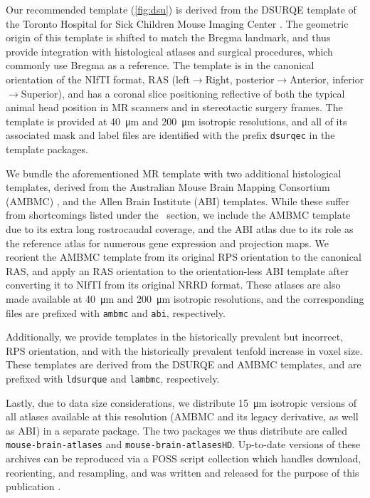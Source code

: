 Our recommended template (\cref{fig:dsu}) is derived from the DSURQE template of the Toronto Hospital for Sick Children Mouse Imaging Center \cite{dsu}.
The geometric origin of this template is shifted to match the Bregma landmark, and thus provide integration with histological atlases and surgical procedures, which commonly use Bregma as a reference.
The template is in the canonical orientation of the NIfTI format, RAS (left$\rightarrow$Right, posterior$\rightarrow$Anterior, inferior$\rightarrow$Superior), and has a coronal slice positioning reflective of both the typical animal head position in MR scanners and in stereotactic surgery frames.
The template is provided at \SI{40}{\micro\meter} and \SI{200}{\micro\meter} isotropic resolutions,
and all of its associated mask and label files are identified with the prefix \textcolor{mg}{\texttt{dsurqec}} in the template packages.

We bundle the aforementioned MR template with two additional histological templates, derived from the Australian Mouse Brain Mapping Consortium (AMBMC) \cite{amb}, and the Allen Brain Institute (ABI) \cite{abi} templates.
While these suffer from shortcomings listed under the ~section, we include the AMBMC template due to its extra long rostrocaudal coverage, and the ABI atlas due to its role as the reference atlas for numerous gene expression and projection maps.
We reorient the AMBMC template from its original RPS orientation to the canonical RAS, and apply an RAS orientation to the orientation-less ABI template after converting it to NIfTI from its original NRRD format.
These atlases are also made available at \SI{40}{\micro\meter} and \SI{200}{\micro\meter} isotropic resolutions, and the corresponding files are prefixed with \textcolor{mg}{\texttt{ambmc}} and \textcolor{mg}{\texttt{abi}}, respectively.

Additionally, we provide templates in the historically prevalent but incorrect, RPS orientation, and with the historically prevalent tenfold increase in voxel size.
These templates are derived from the DSURQE and AMBMC templates, and are prefixed with \textcolor{mg}{\texttt{ldsurque}} and \textcolor{mg}{\texttt{lambmc}}, respectively.

Lastly, due to data size considerations, we distribute \SI{15}{\micro\meter} isotropic versions of all atlases available at this resolution (AMBMC and its legacy derivative, as well as ABI) in a separate package.
The two packages we thus distribute are called \textcolor{mg}{\texttt{mouse-brain-atlases}} and \textcolor{mg}{\texttt{mouse-brain-atlasesHD}}.
Up-to-date versions of these archives can be reproduced via a FOSS script collection which handles download, reorienting, and resampling, and was written and released for the purpose of this publication \cite{atlases_generator}.

